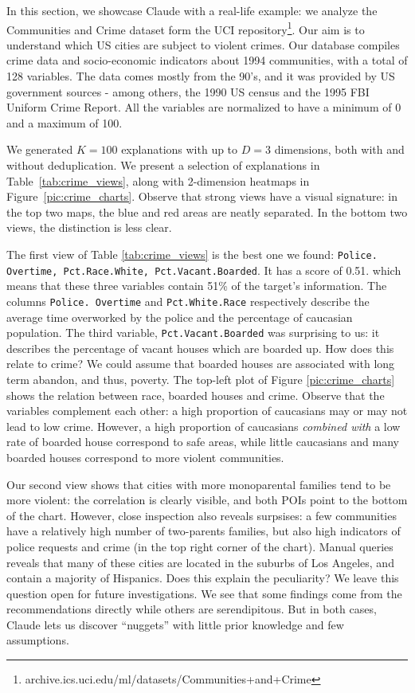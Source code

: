In this section, we showcase Claude with a real-life example: we analyze the
Communities and Crime dataset form the UCI
repository\footnote{archive.ics.uci.edu/ml/datasets/Communities+and+Crime}.
Our aim is to understand which US cities are subject to violent crimes. Our
database compiles crime data and socio-economic indicators about 1994
communities, with a total of 128 variables. The data comes mostly from the
90's, and it was provided by US government sources - among others, the 1990 US
census and the 1995 FBI Uniform Crime Report. All the variables are
normalized to have a minimum of 0 and a maximum of 100.

We generated $K=100$ explanations with up to $D=3$ dimensions, both with and
without deduplication. We present a selection of explanations in
Table~\ref{tab:crime_views}, along with 2-dimension heatmaps in
Figure~\ref{pic:crime_charts}. Observe that strong views have a visual
signature: in the top two maps, the blue and red areas are neatly separated. In
the bottom two views, the distinction is less clear.

The first view of Table \ref{tab:crime_views} is the best one we found:
\texttt{Police. Overtime, Pct.Race.White, Pct.Vacant.Boarded}. It has a score
of 0.51. which means that these three variables contain 51\% of the target's
information. The columns \texttt{Police. Overtime} and \texttt{Pct.White.Race}
respectively describe the average time overworked by the police and the
percentage of caucasian population. The third variable,
\texttt{Pct.Vacant.Boarded} was surprising to us: it describes the
percentage of vacant houses which are boarded up.  How does this relate to
crime? We could assume that boarded houses are associated with long term
abandon, and thus, poverty. The top-left plot of Figure \ref{pic:crime_charts}
shows the relation between race, boarded houses and crime. Observe that the
variables complement each other: a high proportion of caucasians may or may not
lead to low crime. However, a high proportion of caucasians \emph{combined
with} a low rate of boarded house correspond to safe areas, while little
caucasians and many boarded houses correspond to more violent communities.

Our second view shows that cities with more monoparental families tend to be
more violent: the correlation is clearly visible, and both POIs point to the
bottom of the chart. However, close inspection also reveals surpsises: a few
communities have a relatively high number of two-parents families, but also
high indicators of police requests and crime (in the top right corner of the
chart). Manual queries reveals that many of these cities are located in the
suburbs of Los Angeles, and contain a majority of Hispanics. Does this explain
the peculiarity? We leave this question open for future investigations. We see
that some findings come from the recommendations directly while others are
serendipitous.  But in both cases, Claude lets us discover ``nuggets'' with
little prior knowledge and few assumptions. 

